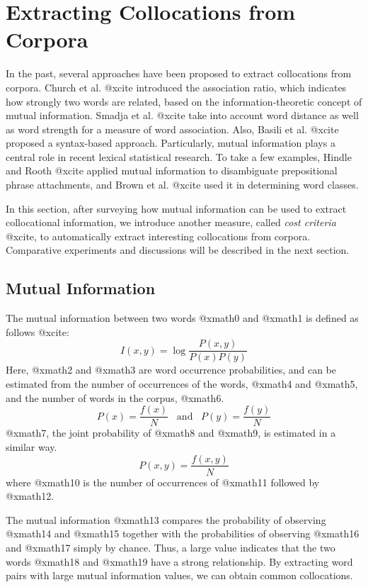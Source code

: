 \section{Extracting Collocations from Corpora}

In the past, several approaches have been proposed to
extract collocations from corpora.
Church et al. @xcite introduced the association ratio,
which indicates how strongly two words are related,
based on the information-theoretic concept of mutual information.
Smadja et al. @xcite take into account word distance
as well as word strength for a measure of word association.
Also, Basili et al. @xcite proposed a syntax-based approach.
Particularly, mutual information plays a central role
in recent lexical statistical research.
To take a few examples,
Hindle and Rooth @xcite applied mutual information to disambiguate
prepositional phrase attachments,
and Brown et al. @xcite used it in determining word classes.

In this section, after surveying how mutual information
can be used to extract collocational information,
we introduce another measure, called {\em cost criteria} @xcite,
to automatically extract interesting collocations
from corpora.
Comparative experiments and discussions will be described
in the next section.

\subsection{Mutual Information}

The mutual information between two words @xmath0 and @xmath1 is defined
as follows @xcite:
\begin{equation}
  I(x,y) = \log \frac{P(x,y)}{P(x)P(y)}
\end{equation}
Here, @xmath2 and @xmath3 are word occurrence probabilities,
and can be estimated from the number of occurrences of the words, @xmath4 and @xmath5,
and the number of words in the corpus, @xmath6.
\begin{equation}
  P(x) = \frac{f(x)}{N} \,\,\,\,\, \mbox{and} \,\,\,\,\, P(y) = \frac{f(y)}{N}
\end{equation}
@xmath7, the joint probability of @xmath8 and @xmath9, is estimated in a similar way.
\begin{equation}
  P(x,y) = \frac{f(x,y)}{N}
\end{equation}
where @xmath10 is the number of occurrences of
@xmath11 followed by @xmath12.

The mutual information @xmath13 compares the probability
of observing @xmath14 and @xmath15 together
with the probabilities of observing @xmath16 and @xmath17 simply by chance.
Thus, a large value indicates that the two words @xmath18 and @xmath19
have a strong relationship.
By extracting word pairs with large mutual information values,
we can obtain common collocations.

